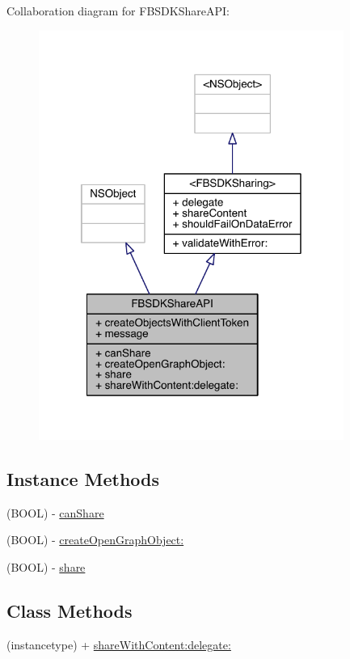 Collaboration diagram for F\-B\-S\-D\-K\-Share\-A\-P\-I\-:
\nopagebreak
\begin{figure}[H]
\begin{center}
\leavevmode
\includegraphics[width=283pt]{interface_f_b_s_d_k_share_a_p_i__coll__graph}
\end{center}
\end{figure}
\subsection*{Instance Methods}
\begin{DoxyCompactItemize}
\item 
(B\-O\-O\-L) -\/ \hyperlink{interface_f_b_s_d_k_share_a_p_i_a785150525008f6d86334ec4fb0bf51a9}{can\-Share}
\item 
(B\-O\-O\-L) -\/ \hyperlink{interface_f_b_s_d_k_share_a_p_i_a228e7a9168a9c48e19af98236bba89e4}{create\-Open\-Graph\-Object\-:}
\item 
(B\-O\-O\-L) -\/ \hyperlink{interface_f_b_s_d_k_share_a_p_i_ab04f5ec10df40c652e6f3720f50027bd}{share}
\end{DoxyCompactItemize}
\subsection*{Class Methods}
\begin{DoxyCompactItemize}
\item 
(instancetype) + \hyperlink{interface_f_b_s_d_k_share_a_p_i_a97dd7db2536228ae3015bb9f4a0e84fe}{share\-With\-Content\-:delegate\-:}
\end{DoxyCompactItemize}
